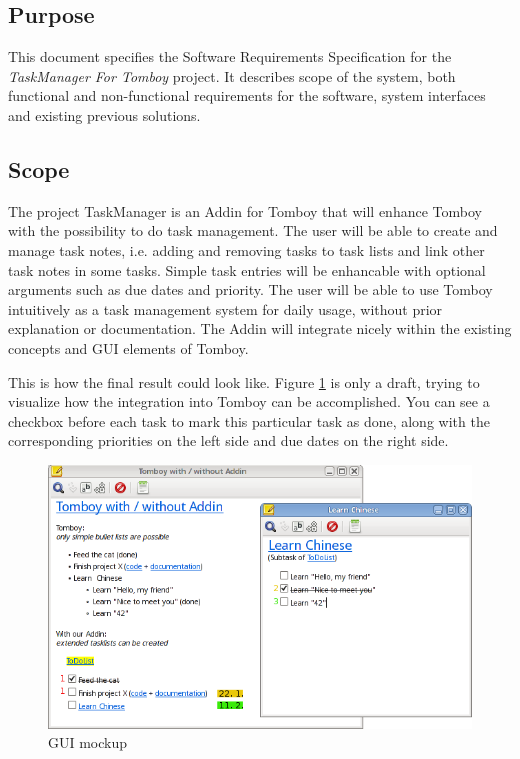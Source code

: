 \subsection{Purpose}
\label{intro:purpose}
This document specifies the Software Requirements Specification for the \textit{TaskManager For Tomboy} project.
It describes scope of the system, both functional and non-functional requirements for the software, system interfaces and existing previous solutions.


\subsection{Scope}
\label{intro:scope}
The project TaskManager is an Addin for Tomboy that will enhance Tomboy with the possibility to do task management. 
The user will be able to create and manage task notes, i.e. adding and removing tasks to task lists and link other task notes in some tasks.
Simple task entries will be enhancable with optional arguments such as due dates and priority.
The user will be able to use Tomboy intuitively as a task management system for daily usage, without prior explanation or documentation. 
The Addin will integrate nicely within the existing concepts and GUI elements of Tomboy.

This is how the final result could look like. Figure \ref{gui} is only a draft, trying to visualize how the integration into Tomboy can be accomplished. You can see a checkbox before each task to mark this particular task as done, along with the corresponding priorities on the left side and due dates on the right side.
\begin{figure}[h]
  \includegraphics[width=\textwidth]{graphics/Screenshot_cropped_edited.png}
  \caption{GUI mockup}
  \label{gui}
\end{figure}


